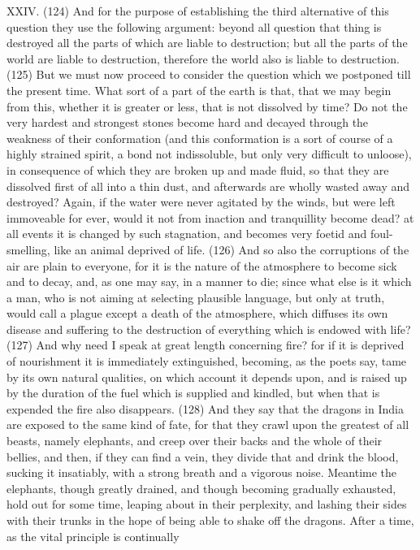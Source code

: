 XXIV. (124) And for the purpose of establishing the third alternative of this question they use the
following argument: beyond all question that thing is destroyed all the parts of which are liable to
destruction; but all the parts of the world are liable to destruction, therefore the world also is liable
to destruction. (125) But we must now proceed to consider the question which we postponed till the
present time. What sort of a part of the earth is that, that we may begin from this, whether it is
greater or less, that is not dissolved by time? Do not the very hardest and strongest stones
become hard and decayed through the weakness of their conformation (and this conformation is a
sort of course of a highly strained spirit, a bond not indissoluble, but only very difficult to unloose),
in consequence of which they are broken up and made fluid, so that they are dissolved first of all
into a thin dust, and afterwards are wholly wasted away and destroyed? Again, if the water were
never agitated by the winds, but were left immoveable for ever, would it not from inaction and
tranquillity become dead? at all events it is changed by such stagnation, and becomes very foetid
and foul-smelling, like an animal deprived of life. (126) And so also the corruptions of the air are
plain to everyone, for it is the nature of the atmosphere to become sick and to decay, and, as one
may say, in a manner to die; since what else is it which a man, who is not aiming at selecting
plausible language, but only at truth, would call a plague except a death of the atmosphere, which
diffuses its own disease and suffering to the destruction of everything which is endowed with life?
(127) And why need I speak at great length concerning fire? for if it is deprived of nourishment it is
immediately extinguished, becoming, as the poets say, tame by its own natural qualities, on which
account it depends upon, and is raised up by the duration of the fuel which is supplied and kindled,
but when that is expended the fire also disappears. (128) And they say that the dragons in India
are exposed to the same kind of fate, for that they crawl upon the greatest of all beasts, namely
elephants, and creep over their backs and the whole of their bellies, and then, if they can find a
vein, they divide that and drink the blood, sucking it insatiably, with a strong breath and a vigorous
noise. Meantime the elephants, though greatly drained, and though becoming gradually exhausted,
hold out for some time, leaping about in their perplexity, and lashing their sides with their trunks in
the hope of being able to shake off the dragons. After a time, as the vital principle is continually

